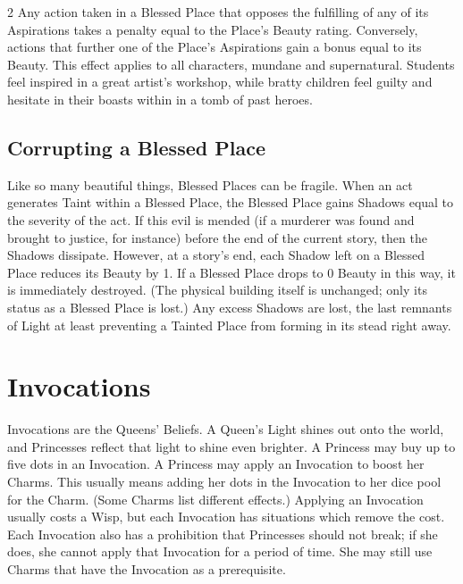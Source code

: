 \begin{multicols}{2}
Any action taken in a Blessed Place that opposes the fulfilling of any of its Aspirations takes a penalty equal to the Place’s Beauty rating. Conversely, actions that further one of the Place’s Aspirations gain a bonus equal to its Beauty. This effect applies to all characters, mundane and supernatural. Students feel inspired in a great artist's workshop, while bratty children feel guilty and hesitate in their boasts within in a tomb of past heroes.  

\subsection*{Corrupting a Blessed Place}

Like so many beautiful things, Blessed Places can be fragile. When an act generates Taint within a Blessed Place, the Blessed Place gains Shadows equal to the severity of the act. If this evil is mended (if a murderer was found and brought to justice, for instance) before the end of the current story, then the Shadows dissipate. However, at a story's end, each Shadow left on a Blessed Place reduces its Beauty by 1. If a Blessed Place drops to 0 Beauty in this way, it is immediately destroyed. (The physical building itself is unchanged; only its status as a Blessed Place is lost.) Any excess Shadows are lost, the last remnants of Light at least preventing a Tainted Place from forming in its stead right away.

\section*{Invocations}
\label{sec:Invocations}

Invocations are the Queens' Beliefs. A Queen's Light shines out onto the world, and Princesses reflect that light to shine even brighter. A Princess may buy up to five dots in an Invocation. A Princess may apply an Invocation to boost her Charms. This usually means adding her dots in the Invocation to her dice pool for the Charm. (Some Charms list different effects.) Applying an Invocation usually costs a Wisp, but each Invocation has situations which remove the cost. Each Invocation also has a prohibition that Princesses should not break; if she does, she cannot apply that Invocation for a period of time. She may still use Charms that have the Invocation as a prerequisite.


\end{multicols}
